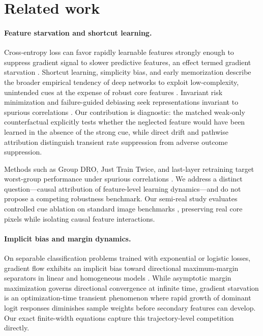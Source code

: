 \documentclass{article}
\theoremstyle{definition}
\theoremstyle{remark}
\begin{document}
\section{Related work}
\paragraph{Feature starvation and shortcut learning.}
Cross-entropy loss can favor rapidly learnable features strongly enough to suppress gradient signal to slower predictive features, an effect termed gradient starvation \citep{pezeshki2021gradient}. Shortcut learning, simplicity bias, and early memorization describe the broader empirical tendency of deep networks to exploit low-complexity, unintended cues at the expense of robust core features \citep{arpit2017memorization,geirhos2020shortcut,shah2020pitfalls,herrmann2020shapes,scimeca2022which}. Invariant risk minimization and failure-guided debiasing seek representations invariant to spurious correlations \citep{arjovsky2019irm,nam2020lff}. Our contribution is diagnostic: the matched weak-only counterfactual explicitly tests whether the neglected feature would have been learned in the absence of the strong cue, while direct drift and pathwise attribution distinguish transient rate suppression from adverse outcome suppression.

Methods such as Group DRO, Just Train Twice, and last-layer retraining target worst-group performance under spurious correlations \citep{sagawa2020groupdro,liu2021jtt,kirichenko2023dfr}. We address a distinct question---causal attribution of feature-level learning dynamics---and do not propose a competing robustness benchmark. Our semi-real study evaluates controlled cue ablation on standard image benchmarks \citep{lecun1998mnist,xiao2017fashion}, preserving real core pixels while isolating causal feature interactions.

\paragraph{Implicit bias and margin dynamics.}
On separable classification problems trained with exponential or logistic losses, gradient flow exhibits an implicit bias toward directional maximum-margin separators in linear and homogeneous models \citep{soudry2018implicit,gunasekar2018implicit,ji2019implicit}. While asymptotic margin maximization governs directional convergence at infinite time, gradient starvation is an optimization-time transient phenomenon where rapid growth of dominant logit responses diminishes sample weights before secondary features can develop. Our exact finite-width equations capture this trajectory-level competition directly.
\end{document}
